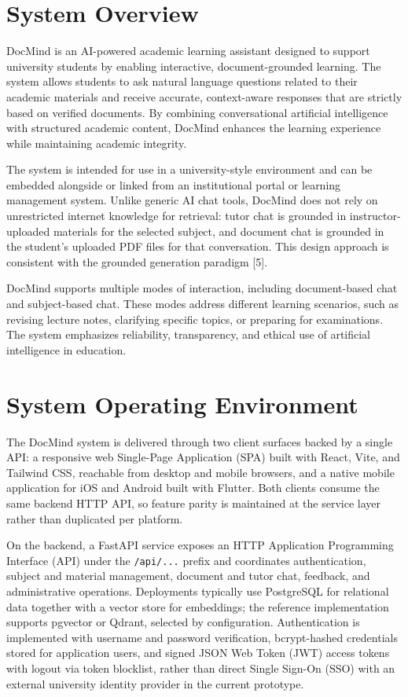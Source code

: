 \documentclass[12pt, a4paper, oneside]{report}
\let\oldsection\section
\renewcommand{\section}{%
  \addtocontents{toc}{\protect\needspace{4\baselineskip}}%
  \oldsection
}
\begin{document}
\section{System Overview}

DocMind is an AI-powered academic learning assistant designed to support university students by enabling interactive, document-grounded learning. The system allows students to ask natural language questions related to their academic materials and receive accurate, context-aware responses that are strictly based on verified documents. By combining conversational artificial intelligence with structured academic content, DocMind enhances the learning experience while maintaining academic integrity.

The system is intended for use in a university-style environment and can be embedded alongside or linked from an institutional portal or learning management system. Unlike generic AI chat tools, DocMind does not rely on unrestricted internet knowledge for retrieval: tutor chat is grounded in instructor-uploaded materials for the selected subject, and document chat is grounded in the student's uploaded PDF files for that conversation. This design approach is consistent with the grounded generation paradigm [5].

DocMind supports multiple modes of interaction, including document-based chat and subject-based chat. These modes address different learning scenarios, such as revising lecture notes, clarifying specific topics, or preparing for examinations. The system emphasizes reliability, transparency, and ethical use of artificial intelligence in education.

\newpage

\section{System Operating Environment}

The DocMind system is delivered through two client surfaces backed by a single API: a responsive web Single-Page Application (SPA) built with React, Vite, and Tailwind CSS, reachable from desktop and mobile browsers, and a native mobile application for iOS and Android built with Flutter. Both clients consume the same backend HTTP API, so feature parity is maintained at the service layer rather than duplicated per platform.

On the backend, a FastAPI service exposes an HTTP Application Programming Interface (API) under the \texttt{/api/...} prefix and coordinates authentication, subject and material management, document and tutor chat, feedback, and administrative operations. Deployments typically use PostgreSQL for relational data together with a vector store for embeddings; the reference implementation supports pgvector or Qdrant, selected by configuration. Authentication is implemented with username and password verification, bcrypt-hashed credentials stored for application users, and signed JSON Web Token (JWT) access tokens with logout via token blocklist, rather than direct Single Sign-On (SSO) with an external university identity provider in the current prototype.
\end{document}
